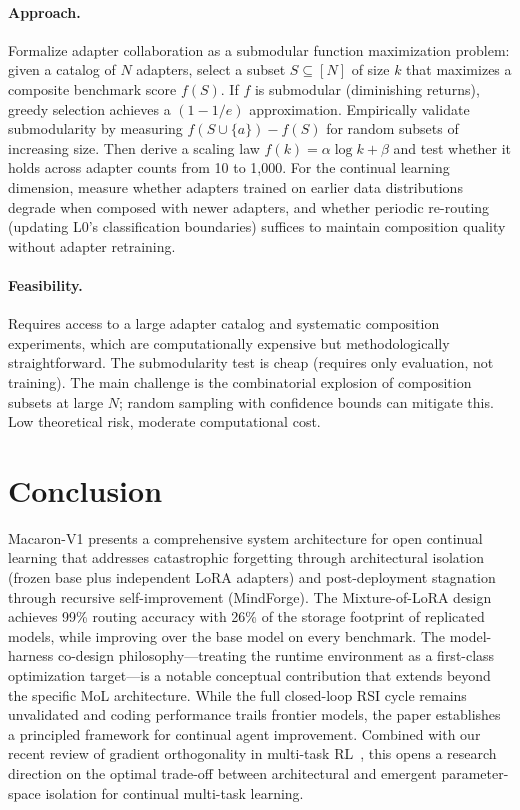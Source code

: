 \documentclass[11pt,a4paper]{article}
\begin{document}
\paragraph{Approach.} Formalize adapter collaboration as a submodular function maximization problem: given a catalog of $N$ adapters, select a subset $S \subseteq [N]$ of size $k$ that maximizes a composite benchmark score $f(S)$. If $f$ is submodular (diminishing returns), greedy selection achieves a $(1 - 1/e)$ approximation. Empirically validate submodularity by measuring $f(S \cup \{a\}) - f(S)$ for random subsets of increasing size. Then derive a scaling law $f(k) = \alpha \log k + \beta$ and test whether it holds across adapter counts from 10 to 1{,}000. For the continual learning dimension, measure whether adapters trained on earlier data distributions degrade when composed with newer adapters, and whether periodic re-routing (updating L0's classification boundaries) suffices to maintain composition quality without adapter retraining.

\paragraph{Feasibility.} Requires access to a large adapter catalog and systematic composition experiments, which are computationally expensive but methodologically straightforward. The submodularity test is cheap (requires only evaluation, not training). The main challenge is the combinatorial explosion of composition subsets at large $N$; random sampling with confidence bounds can mitigate this. Low theoretical risk, moderate computational cost.

\section{Conclusion}

Macaron-V1 presents a comprehensive system architecture for open continual learning that addresses catastrophic forgetting through architectural isolation (frozen base plus independent LoRA adapters) and post-deployment stagnation through recursive self-improvement (MindForge). The Mixture-of-LoRA design achieves 99\% routing accuracy with 26\% of the storage footprint of replicated models, while improving over the base model on every benchmark. The model-harness co-design philosophy---treating the runtime environment as a first-class optimization target---is a notable conceptual contribution that extends beyond the specific MoL architecture. While the full closed-loop RSI cycle remains unvalidated and coding performance trails frontier models, the paper establishes a principled framework for continual agent improvement. Combined with our recent review of gradient orthogonality in multi-task RL~\cite{zhu2026sft}, this opens a research direction on the optimal trade-off between architectural and emergent parameter-space isolation for continual multi-task learning.
\end{document}
